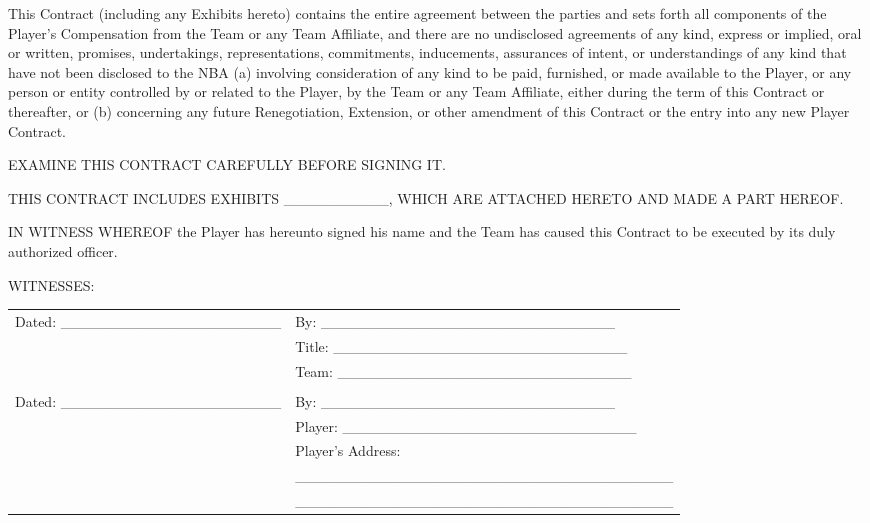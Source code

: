 \documentclass[
]{book}
\begin{document}
\begin{enumerate}
  This Contract (including any Exhibits hereto) contains the entire agreement between the parties and sets forth all components of the Player's Compensation from the Team or any Team Affiliate, and there are no undisclosed agreements of any kind, express or implied, oral or written, promises, undertakings, representations, commitments, inducements, assurances of intent, or understandings of any kind that have not been disclosed to the NBA (a) involving consideration of any kind to be paid, furnished, or made available to the Player, or any person or entity controlled by or related to the Player, by the Team or any Team Affiliate, either during the term of this Contract or thereafter, or (b) concerning any future Renegotiation, Extension, or other amendment of this Contract or the entry into any new Player Contract.
\end{enumerate}

\newpage

EXAMINE THIS CONTRACT CAREFULLY BEFORE SIGNING IT.

THIS CONTRACT INCLUDES EXHIBITS \_\_\_\_\_\_\_\_\_\_, WHICH ARE ATTACHED HERETO AND MADE A PART HEREOF.

IN WITNESS WHEREOF the Player has hereunto signed his name and the Team has caused this Contract to be executed by its duly authorized officer.

WITNESSES:

\begin{longtable}[]{@{}ll@{}}
\toprule()
\endhead
Dated: \_\_\_\_\_\_\_\_\_\_\_\_\_\_\_\_\_\_\_\_\_ & By: \_\_\_\_\_\_\_\_\_\_\_\_\_\_\_\_\_\_\_\_\_\_\_\_\_\_\_\_ \\
& Title: \_\_\_\_\_\_\_\_\_\_\_\_\_\_\_\_\_\_\_\_\_\_\_\_\_\_\_\_ \\
& Team: \_\_\_\_\_\_\_\_\_\_\_\_\_\_\_\_\_\_\_\_\_\_\_\_\_\_\_\_ \\
& \\
Dated: \_\_\_\_\_\_\_\_\_\_\_\_\_\_\_\_\_\_\_\_\_ & By: \_\_\_\_\_\_\_\_\_\_\_\_\_\_\_\_\_\_\_\_\_\_\_\_\_\_\_\_ \\
& Player: \_\_\_\_\_\_\_\_\_\_\_\_\_\_\_\_\_\_\_\_\_\_\_\_\_\_\_\_ \\
& Player's Address: \\
& \_\_\_\_\_\_\_\_\_\_\_\_\_\_\_\_\_\_\_\_\_\_\_\_\_\_\_\_\_\_\_\_\_\_\_\_ \\
& \_\_\_\_\_\_\_\_\_\_\_\_\_\_\_\_\_\_\_\_\_\_\_\_\_\_\_\_\_\_\_\_\_\_\_\_ \\
\bottomrule()
\end{longtable}
\end{document}
